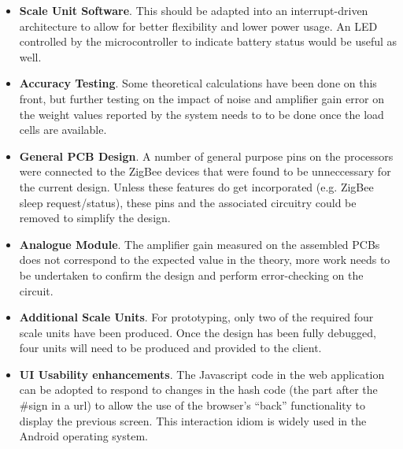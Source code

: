 \begin{itemize}
	\item \textbf{Scale Unit Software}. This should be adapted into an interrupt-driven architecture to allow for better flexibility and lower power usage. An LED controlled by the microcontroller to indicate battery status would be useful as well.
	\item \textbf{Accuracy Testing}. Some theoretical calculations have been done on this front, but further testing on the impact of noise and amplifier gain error on the weight values reported by the system needs to to be done once the load cells are available.
	\item \textbf{General PCB Design}. A number of general purpose pins on the processors were connected to the ZigBee devices that were found to be unneccessary for the current design. Unless these features do get incorporated (e.g. ZigBee sleep request/status), these pins and the associated circuitry could be removed to simplify the design.
	\item \textbf{Analogue Module}. The amplifier gain measured on the assembled PCBs does not correspond to the expected value in the theory, more work needs to be undertaken to confirm the design and perform error-checking on the circuit.
	\item \textbf{Additional Scale Units}. For prototyping, only two of the required four scale units have been produced. Once the design has been fully debugged, four units will need to be produced and provided to the client.
	\item \textbf{UI Usability enhancements}. The Javascript code in the web application can be adopted to respond to changes in the hash code (the part after the #sign in a url) to allow the use of the browser's ``back'' functionality to display the previous screen. This interaction idiom is widely used in the Android operating system.
\end{itemize}
